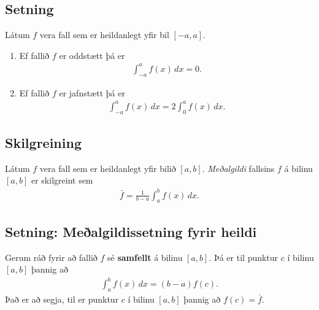\documentclass[b5paper,11pt,icelandic]{sphinxmanual}
\begin{document}
\subsection{Setning}
\label{kafli06:id6}
Látum \(f\) vera fall sem er heildanlegt yfir bil \([-a, a]\).
\begin{enumerate}
\item {} 
Ef fallið \(f\) er oddstætt þá er
\begin{equation*}
\begin{split}\int_{-a}^a f(x)\,dx=0.\end{split}
\end{equation*}
\item {} 
Ef fallið \(f\) er jafnstætt þá er
\begin{equation*}
\begin{split}\int_{-a}^a f(x)\,dx=2\int_0^a f(x)\,dx.\end{split}
\end{equation*}
\end{enumerate}


\subsection{Skilgreining}
\label{kafli06:id7}\label{kafli06:index-3}
Látum \(f\) vera fall sem er heildanlegt yfir bilið \([a, b]\).
\textit{Meðalgildi} fallsins \(f\) á bilinu \([a, b]\) er skilgreint
sem
\begin{equation*}
\begin{split}\bar{f}=\frac{1}{b-a}\int_{a}^b f(x)\,dx.\end{split}
\end{equation*}

\subsection{Setning: Meðalgildissetning fyrir heildi}
\label{kafli06:setning-mealgildissetning-fyrir-heildi}\label{kafli06:index-4}
Gerum ráð fyrir að fallið \(f\) sé \textbf{samfellt} á bilinu
\([a, b]\). Þá er til punktur \(c\) í bilinu \([a, b]\)
þannig að
\begin{equation*}
\begin{split}\int_a^b f(x)\,dx=(b-a)f(c).\end{split}
\end{equation*}
Það er að segja, til er punktur \(c\) í bilinu \([a, b]\) þannig
að \(f(c)=\bar{f}\).
\end{document}
